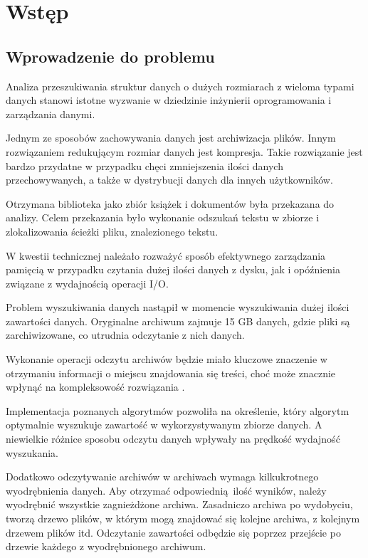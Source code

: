\chapter{Wstęp}

\section{Wprowadzenie do problemu}
Analiza przeszukiwania struktur danych o dużych rozmiarach z wieloma typami danych stanowi
istotne wyzwanie w dziedzinie inżynierii oprogramowania i zarządzania danymi. 

Jednym ze sposobów zachowywania danych jest archiwizacja plików. Innym 
rozwiązaniem redukującym rozmiar danych jest kompresja. Takie rozwiązanie jest
bardzo przydatne w przypadku chęci
zmniejszenia ilości danych przechowywanych, a także w dystrybucji danych dla
innych użytkowników.

Otrzymana biblioteka jako zbiór książek i dokumentów była przekazana do analizy.
Celem przekazania było wykonanie odszukań tekstu w zbiorze i zlokalizowania
ścieżki pliku, znalezionego tekstu.

W kwestii technicznej należało rozważyć sposób efektywnego zarządzania pamięcią
w przypadku czytania dużej ilości danych z dysku, jak i opóźnienia związane z 
wydajnością operacji I/O.

Problem wyszukiwania danych nastąpił w momencie wyszukiwania dużej ilości 
zawartości danych. Oryginalne archiwum zajmuje 15 GB danych, gdzie pliki są 
zarchiwizowane, co utrudnia odczytanie z nich danych. 

Wykonanie operacji odczytu archiwów będzie miało kluczowe znaczenie w 
otrzymaniu informacji o miejscu znajdowania się treści, choć może znacznie 
wpłynąć na kompleksowość rozwiązania \cite{bib:ksiazka:kompleksowośćArchiwów}.

Implementacja poznanych algorytmów pozwoliła na określenie, który algorytm 
optymalnie wyszukuje zawartość w wykorzystywanym zbiorze danych. A niewielkie
różnice sposobu odczytu danych wpływały na prędkość wydajność wyszukania.

Dodatkowo odczytywanie archiwów w archiwach wymaga kilkukrotnego wyodrębnienia
danych. Aby otrzymać odpowiednią ilość wyników, należy wyodrębnić 
wszystkie zagnieżdżone archiwa. Zasadniczo archiwa po wydobyciu,
tworzą drzewo plików, w którym mogą znajdować się kolejne archiwa, z kolejnym drzewem
plików itd. Odczytanie zawartości odbędzie się poprzez przejście po drzewie 
każdego z wyodrębnionego archiwum.

